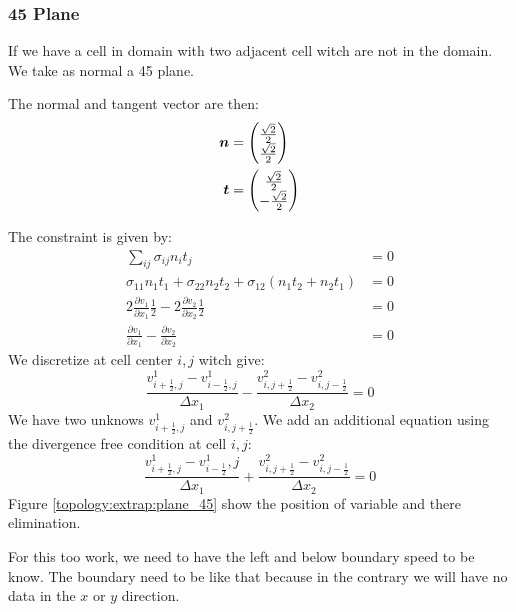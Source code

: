 \subsubsection{\unit{45}{\degree} Plane}

If we have a cell in domain with two adjacent cell witch are not in the domain.
We take as normal a \unit{45}{\degree} plane.

The normal and tangent vector are then:
\begin{align}
	{\boldsymbol {n}}&=\begin{pmatrix}
	\frac{\sqrt{2}}{2}\\
	\frac{\sqrt{2}}{2}
	\end{pmatrix}\\
	{\boldsymbol {t}}&=\begin{pmatrix}
			\frac{\sqrt{2}}{2}\\
			-\frac{\sqrt{2}}{2}
		\end{pmatrix}
\end{align}

The constraint is given by:
\begin{align}
	\sum_{ij}\sigma_{ij}n_{i}t_{j}&=0\\
	\sigma_{11}n_{1}t_{1}+\sigma_{22}n_{2}t_{2}+\sigma_{12}(n_{1}t_{2}+n_{2}t_{1})&=0\\
	2\frac{\partial v_{1}}{\partial x_{1}}\frac{1}{2}-2\frac{\partial v_{2}}{\partial x_{2}}\frac{1}{2}&=0\\
	\frac{\partial v_{1}}{\partial x_{1}}-\frac{\partial v_{2}}{\partial x_{2}}&=0
\end{align}
We discretize at cell center $i,j$ witch give:
\begin{equation}
	\frac{v^{1}_{i+\frac{1}{2},j}-v^{1}_{i-\frac{1}{2},j}}{\Delta x_{1}}-\frac{v^{2}_{i,j+\frac{1}{2}}-v^{2}_{i,j-\frac{1}{2}}}{\Delta x_{2}}=0
\end{equation}
We have two unknows $v^{1}_{i+\frac{1}{2},j}$ and $v^{2}_{i,j+\frac{1}{2}}$.
We add an additional equation using the divergence free condition at cell $i,j$:
\begin{equation}
	\frac{v^{1}_{i+\frac{1}{2},j}-v^{1}_{i-\frac{1}{2}},j}{\Delta x_{1}}+\frac{v^{2}_{i,j+\frac{1}{2}}-v^{2}_{i,j-\frac{1}{2}}}{\Delta x_2}=0
\end{equation}
Figure \ref{topology:extrap:plane_45} show the position of variable and  there elimination.

For this too work, we need to have the left and below boundary speed to be know.
The boundary need to be like that because in the contrary we will have no data in the $x$ or $y$ direction.

